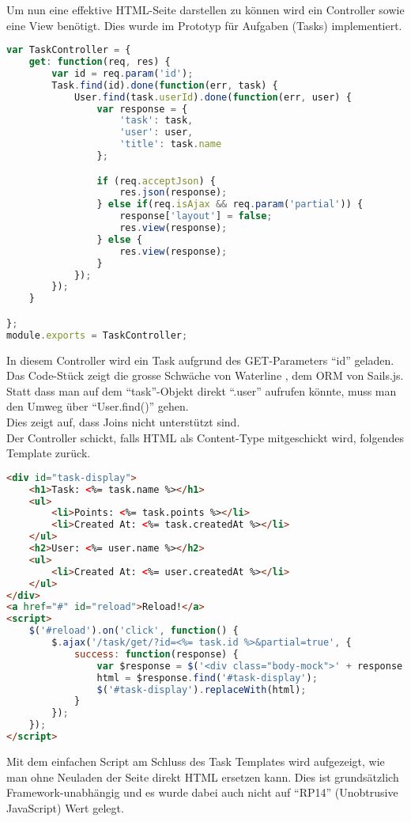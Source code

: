 Um nun eine effektive HTML-Seite darstellen zu können wird ein Controller sowie eine View benötigt. Dies wurde im Prototyp für Aufgaben (Tasks) implementiert.\\

\begin{lstlisting}[language=JavaScript, caption=Task Controller in Sails.js, label=lst:sailsjstaskcontroller]
var TaskController = {
	get: function(req, res) {
		var id = req.param('id');
		Task.find(id).done(function(err, task) {
			User.find(task.userId).done(function(err, user) {
				var response = {
					'task': task,
					'user': user,
					'title': task.name
				};

				if (req.acceptJson) {
					res.json(response);
				} else if(req.isAjax && req.param('partial')) {
					response['layout'] = false;
					res.view(response);
				} else {
					res.view(response);
				}
			});
		});
	}

};
module.exports = TaskController;
\end{lstlisting}

In diesem Controller wird ein Task aufgrund des GET-Parameters ``id'' geladen. Das Code-Stück zeigt die grosse Schwäche von Waterline \cite{Waterline}, dem \gls{ORM} von Sails.js. Statt dass man auf dem ``task''-Objekt direkt ``.user'' aufrufen könnte, muss man den Umweg über ``User.find()'' gehen. \\
Dies zeigt auf, dass Joins nicht unterstützt sind.\\[1mm]

Der Controller schickt, falls HTML als Content-Type mitgeschickt wird, folgendes Template zurück.

\begin{lstlisting}[language=HTML, caption=Task Template]
<div id="task-display">
	<h1>Task: <%= task.name %></h1>
	<ul>
		<li>Points: <%= task.points %></li>
		<li>Created At: <%= task.createdAt %></li>
	</ul>
	<h2>User: <%= user.name %></h2>
	<ul>
		<li>Created At: <%= user.createdAt %></li>
	</ul>
</div>
<a href="#" id="reload">Reload!</a>
<script>
	$('#reload').on('click', function() {
		$.ajax('/task/get/?id=<%= task.id %>&partial=true', {
			success: function(response) {
				var $response = $('<div class="body-mock">' + response + '</div>');
				html = $response.find('#task-display');
				$('#task-display').replaceWith(html);
			}
		});
	});
</script>
\end{lstlisting}

Mit dem einfachen Script am Schluss des Task Templates wird aufgezeigt, wie man ohne Neuladen der Seite direkt HTML ersetzen kann. Dies ist grundsätzlich Framework-unabhängig und es wurde dabei auch nicht auf ``RP14'' (Unobtrusive JavaScript) Wert gelegt.

